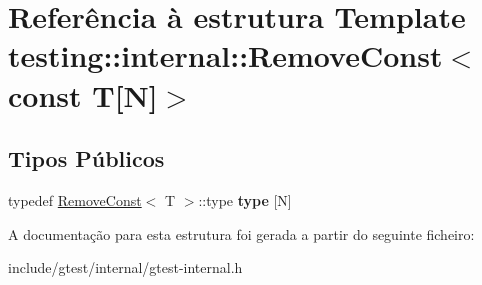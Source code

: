 \hypertarget{structtesting_1_1internal_1_1RemoveConst_3_01const_01T[N]_4}{\section{Referência à estrutura Template testing\-:\-:internal\-:\-:Remove\-Const$<$ const T\mbox{[}N\mbox{]}$>$}
\label{structtesting_1_1internal_1_1RemoveConst_3_01const_01T[N]_4}
}
\subsection*{Tipos Públicos}
\begin{DoxyCompactItemize}
\item 
\hypertarget{structtesting_1_1internal_1_1RemoveConst_3_01const_01T[N]_4_ac976b53cb5d031a120fafbe790650068}{typedef \hyperlink{structtesting_1_1internal_1_1RemoveConst}{Remove\-Const}$<$ T $>$\-::type {\bfseries type} \mbox{[}N\mbox{]}}\label{structtesting_1_1internal_1_1RemoveConst_3_01const_01T[N]_4_ac976b53cb5d031a120fafbe790650068}

\end{DoxyCompactItemize}


A documentação para esta estrutura foi gerada a partir do seguinte ficheiro\-:\begin{DoxyCompactItemize}
\item 
include/gtest/internal/gtest-\/internal.\-h\end{DoxyCompactItemize}
